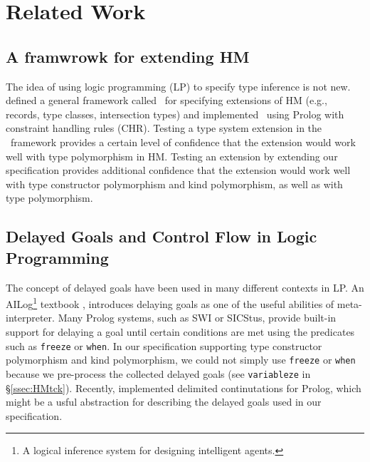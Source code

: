 \section{Related Work}\label{sec:relwork}
\subsection{A framwrowk for extending HM}
The idea of using logic programming (LP) to specify type inference is not new.
\citet*{HMX99} defined a general framework called \HMX\ for specifying
extensions of HM (e.g., records, type classes, intersection types)
and \citet{tyinferCHR02} implemented \HMX\ using Prolog with
constraint handling rules (CHR). Testing a type system extension
in the \HMX\ framework provides a certain level of confidence that the extension
would work well with type polymorphism in HM. Testing an extension by
extending our specification provides additional confidence that the extension
would work well with type constructor polymorphism and kind polymorphism,
as well as with type polymorphism.

\subsection{Delayed Goals and Control Flow in Logic Programming}
The concept of delayed goals have been used in many different contexts
in LP. An AILog\footnote{A logical inference system for designing
	 intelligent agents.} textbook \cite{AILogTextBook},
introduces delaying goals as one of the useful abilities of meta-interpreter.
Many Prolog systems, such as SWI or SICStus, provide built-in support for
delaying a goal until certain conditions are met using the predicates
such as \verb|freeze| or \verb|when|. In our specification supporting
type constructor polymorphism and kind polymorphism, we could not
simply use \verb|freeze| or \verb|when| because we pre-process
the collected delayed goals (see \verb|variableze| in \S\ref{ssec:HMtck}).
Recently, \citet{SchDemDesWei13} implemented delimited continutations for
Prolog, which might be a usful abstraction for describing the delayed goals
used in our specification.

